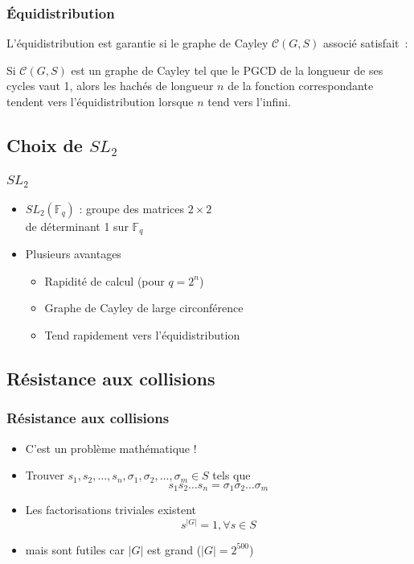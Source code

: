 \documentclass{beamer}
\newcommand{\C}{\mathcal{C}}
\newcommand{\F}{\mathbb{F}}
\begin{document}
\begin{frame}
 \frametitle{Équidistribution}
 
 L'équidistribution est garantie si le graphe de Cayley $\C(G,S)$ associé satisfait~:
 \begin{theorem}
  Si $\C(G,S)$ est un graphe de Cayley tel que le PGCD de la longueur de ses cycles vaut 1, alors les hachés de 
  longueur $n$ de la fonction correspondante tendent vers l'équidistribution lorsque $n$ tend vers l'infini.
 \end{theorem}
\end{frame}

\subsection{Choix de $SL_2$}
\begin{frame}
 \frametitle{$SL_2$}

 \begin{itemize}
  \item $SL_2(\F_q)$ : groupe des matrices $2 \times 2$ \\ de déterminant 1 sur $\F_q$
  \item Plusieurs avantages
  \begin{itemize}
   \item Rapidité de calcul (pour $q=2^n$)
   \item Graphe de Cayley de large circonférence
   \item Tend rapidement vers l'équidistribution
  \end{itemize}
 \end{itemize}
\end{frame}

\subsection{Résistance aux collisions}

\begin{frame}
 \frametitle{Résistance aux collisions}
 \begin{itemize}
  \item C'est un problème mathématique !
  \item Trouver $s_1,s_2, \ldots, s_n, \sigma_1, \sigma_2, \ldots, \sigma_m \in S$ tels que 
     $$ s_1s_2 \ldots s_n = \sigma_1\sigma_2 \ldots \sigma_m $$
  \pause 
  \item Les factorisations triviales existent
     $$ s^{|G|} = 1, \forall s \in S $$
  \pause 
  \item mais sont futiles car $|G|$ est grand ($|G| = 2^{500}$)
 \end{itemize}
\end{frame}
\end{document}
